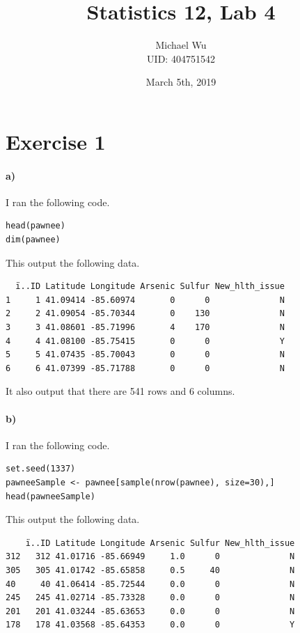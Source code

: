 \documentclass[12pt]{article}
\begin{document}
\title{Statistics 12, Lab 4}
\date{March 5th, 2019}
\author{Michael Wu\\UID: 404751542}
\maketitle

\section*{Exercise 1}

\paragraph{a)}

I ran the following code.
\begin{verbatim}
head(pawnee)
dim(pawnee)
\end{verbatim}
This output the following data.
\begin{verbatim}
  ï..ID Latitude Longitude Arsenic Sulfur New_hlth_issue
1     1 41.09414 -85.60974       0      0              N
2     2 41.09054 -85.70344       0    130              N
3     3 41.08601 -85.71996       4    170              N
4     4 41.08100 -85.75415       0      0              Y
5     5 41.07435 -85.70043       0      0              N
6     6 41.07399 -85.71788       0      0              N
\end{verbatim}
It also output that there are 541 rows and 6 columns.

\paragraph{b)}

I ran the following code.
\begin{verbatim}
set.seed(1337)
pawneeSample <- pawnee[sample(nrow(pawnee), size=30),]
head(pawneeSample)
\end{verbatim}
This output the following data.
\begin{verbatim}
    ï..ID Latitude Longitude Arsenic Sulfur New_hlth_issue
312   312 41.01716 -85.66949     1.0      0              N
305   305 41.01742 -85.65858     0.5     40              N
40     40 41.06414 -85.72544     0.0      0              N
245   245 41.02714 -85.73328     0.0      0              N
201   201 41.03244 -85.63653     0.0      0              N
178   178 41.03568 -85.64353     0.0      0              Y
\end{verbatim}
\end{document}
